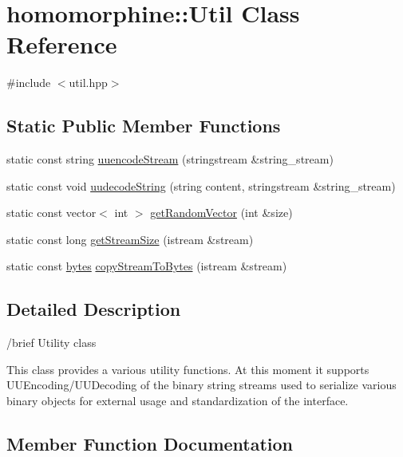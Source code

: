 \hypertarget{classhomomorphine_1_1_util}{}\section{homomorphine\+::Util Class Reference}
\label{classhomomorphine_1_1_util}


{\ttfamily \#include $<$util.\+hpp$>$}

\subsection*{Static Public Member Functions}
\begin{DoxyCompactItemize}
\item 
static const string \mbox{\hyperlink{classhomomorphine_1_1_util_a26f29995aa48f4374993ec4afeca2ac8}{uuencode\+Stream}} (stringstream \&string\+\_\+stream)
\item 
static const void \mbox{\hyperlink{classhomomorphine_1_1_util_aba5af6d7356aca8c70ae4fb1e5d36b70}{uudecode\+String}} (string content, stringstream \&string\+\_\+stream)
\item 
static const vector$<$ int $>$ \mbox{\hyperlink{classhomomorphine_1_1_util_a2dcf1d83028f3d47ba49b80696fefef7}{get\+Random\+Vector}} (int \&size)
\item 
static const long \mbox{\hyperlink{classhomomorphine_1_1_util_acf2321afce14e9c20ca572159592e0e2}{get\+Stream\+Size}} (istream \&stream)
\item 
static const \mbox{\hyperlink{structbyte__array__t}{bytes}} \mbox{\hyperlink{classhomomorphine_1_1_util_af81e87e9babd7ab4cd37cd3d1725c5b5}{copy\+Stream\+To\+Bytes}} (istream \&stream)
\end{DoxyCompactItemize}


\subsection{Detailed Description}
/brief Utility class

This class provides a various utility functions. At this moment it supports U\+U\+Encoding/\+U\+U\+Decoding of the binary string streams used to serialize various binary objects for external usage and standardization of the interface. 

\subsection{Member Function Documentation}
\mbox{\label{classhomomorphine_1_1_util_af81e87e9babd7ab4cd37cd3d1725c5b5}} 
